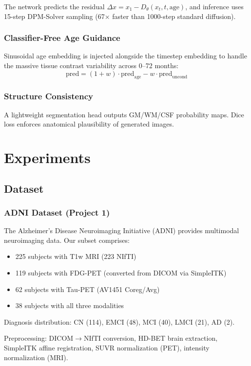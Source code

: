 \documentclass[11pt,a4paper]{article}
\begin{document}
The network predicts the residual $\Delta x = x_1 - D_\theta(x_t, t, \text{age})$, and inference uses 15-step DPM-Solver sampling (67$\times$ faster than 1000-step standard diffusion).

\subsubsection{Classifier-Free Age Guidance}
Sinusoidal age embedding is injected alongside the timestep embedding to handle the massive tissue contrast variability across 0--72 months:
\begin{equation}
\text{pred} = (1+w) \cdot \text{pred}_{\text{age}} - w \cdot \text{pred}_{\text{uncond}}
\end{equation}

\subsubsection{Structure Consistency}
A lightweight segmentation head outputs GM/WM/CSF probability maps. Dice loss enforces anatomical plausibility of generated images.

\section{Experiments}

\subsection{Dataset}

\subsubsection{ADNI Dataset (Project 1)}
The Alzheimer's Disease Neuroimaging Initiative (ADNI) provides multimodal neuroimaging data. Our subset comprises:
\begin{itemize}
    \item 225 subjects with T1w MRI (223 NIfTI)
    \item 119 subjects with FDG-PET (converted from DICOM via SimpleITK)
    \item 62 subjects with Tau-PET (AV1451 Coreg/Avg)
    \item 38 subjects with all three modalities
\end{itemize}
Diagnosis distribution: CN (114), EMCI (48), MCI (40), LMCI (21), AD (2).

Preprocessing: DICOM$\to$NIfTI conversion, HD-BET brain extraction, SimpleITK affine registration, SUVR normalization (PET), intensity normalization (MRI).
\end{document}
